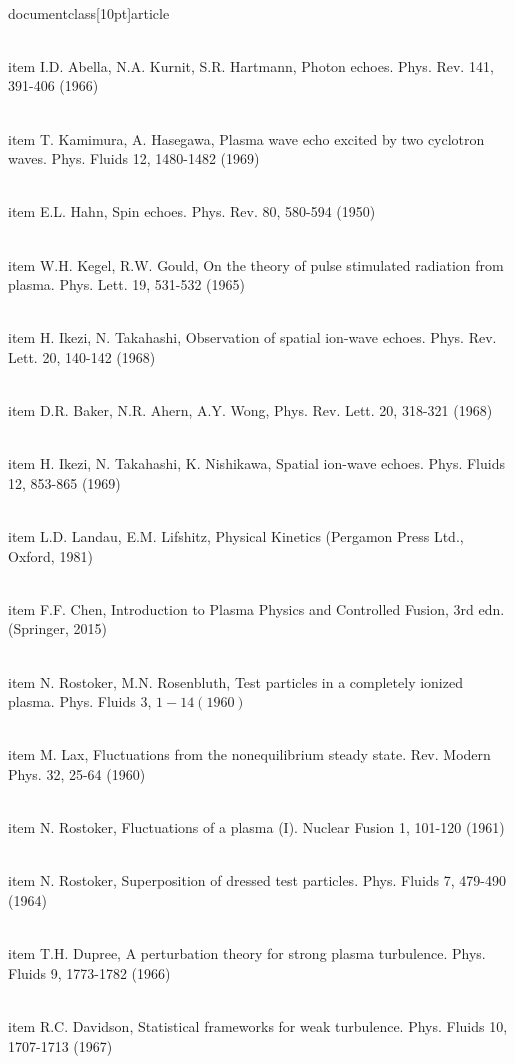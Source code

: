 \\documentclass[10pt]{article}
\begin{document}
{{{{{  \\item I.D. Abella, N.A. Kurnit, S.R. Hartmann, Photon echoes. Phys. Rev. 141, 391-406 (1966)

  \\item T. Kamimura, A. Hasegawa, Plasma wave echo excited by two cyclotron waves. Phys. Fluids 12, 1480-1482 (1969)

  \\item E.L. Hahn, Spin echoes. Phys. Rev. 80, 580-594 (1950)

  \\item W.H. Kegel, R.W. Gould, On the theory of pulse stimulated radiation from plasma. Phys. Lett. 19, 531-532 (1965)

  \\item H. Ikezi, N. Takahashi, Observation of spatial ion-wave echoes. Phys. Rev. Lett. 20, 140-142 (1968)

  \\item D.R. Baker, N.R. Ahern, A.Y. Wong, Phys. Rev. Lett. 20, 318-321 (1968)

  \\item H. Ikezi, N. Takahashi, K. Nishikawa, Spatial ion-wave echoes. Phys. Fluids 12, 853-865 (1969)

  \\item L.D. Landau, E.M. Lifshitz, Physical Kinetics (Pergamon Press Ltd., Oxford, 1981)

  \\item F.F. Chen, Introduction to Plasma Physics and Controlled Fusion, 3rd edn. (Springer, 2015)

  \\item N. Rostoker, M.N. Rosenbluth, Test particles in a completely ionized plasma. Phys. Fluids 3, $1-14(1960)$

  \\item M. Lax, Fluctuations from the nonequilibrium steady state. Rev. Modern Phys. 32, 25-64 (1960)

  \\item N. Rostoker, Fluctuations of a plasma (I). Nuclear Fusion 1, 101-120 (1961)

  \\item N. Rostoker, Superposition of dressed test particles. Phys. Fluids 7, 479-490 (1964)

  \\item T.H. Dupree, A perturbation theory for strong plasma turbulence. Phys. Fluids 9, 1773-1782 (1966)

  \\item R.C. Davidson, Statistical frameworks for weak turbulence. Phys. Fluids 10, 1707-1713 (1967)

}}}}}
\end{document}
